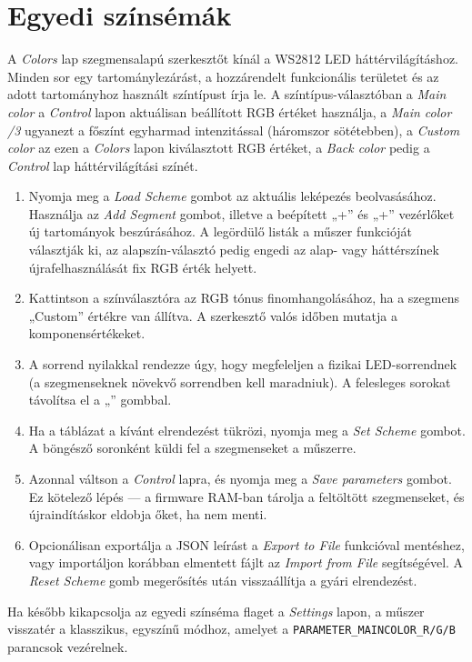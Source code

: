 \section{Egyedi színsémák}
A \emph{Colors} lap szegmensalapú szerkesztőt kínál a WS2812 LED háttérvilágításhoz. Minden sor egy tartománylezárást, a hozzárendelt funkcionális területet és az adott tartományhoz használt színtípust írja le. A színtípus-választóban a \emph{Main color} a \emph{Control} lapon aktuálisan beállított RGB értéket használja, a \emph{Main color /3} ugyanezt a főszínt egyharmad intenzitással (háromszor sötétebben), a \emph{Custom color} az ezen a \emph{Colors} lapon kiválasztott RGB értéket, a \emph{Back color} pedig a \emph{Control} lap háttérvilágítási színét.

\begin{enumerate}
    \item Nyomja meg a \emph{Load Scheme} gombot az aktuális leképezés beolvasásához. Használja az \emph{Add Segment} gombot, illetve a beépített „+\textuparrow{}” és „+\textdownarrow{}” vezérlőket új tartományok beszúrásához. A legördülő listák a műszer funkcióját választják ki, az alapszín-választó pedig engedi az alap- vagy háttérszínek újrafelhasználását fix RGB érték helyett.
    \item Kattintson a színválasztóra az RGB tónus finomhangolásához, ha a szegmens „Custom” értékre van állítva. A szerkesztő valós időben mutatja a komponensértékeket.
    \item A sorrend nyilakkal rendezze úgy, hogy megfeleljen a fizikai LED-sorrendnek (a szegmenseknek növekvő sorrendben kell maradniuk). A felesleges sorokat távolítsa el a „\texttimes{}” gombbal.
    \item Ha a táblázat a kívánt elrendezést tükrözi, nyomja meg a \emph{Set Scheme} gombot. A böngésző soronként küldi fel a szegmenseket a műszerre.
    \item Azonnal váltson a \emph{Control} lapra, és nyomja meg a \emph{Save parameters} gombot. Ez kötelező lépés — a firmware RAM-ban tárolja a feltöltött szegmenseket, és újraindításkor eldobja őket, ha nem menti.
    \item Opcionálisan exportálja a JSON leírást a \emph{Export to File} funkcióval mentéshez, vagy importáljon korábban elmentett fájlt az \emph{Import from File} segítségével. A \emph{Reset Scheme} gomb megerősítés után visszaállítja a gyári elrendezést.
\end{enumerate}

Ha később kikapcsolja az egyedi színséma flaget a \emph{Settings} lapon, a műszer visszatér a klasszikus, egyszínű módhoz, amelyet a \verb|PARAMETER_MAINCOLOR_R/G/B| parancsok vezérelnek.
